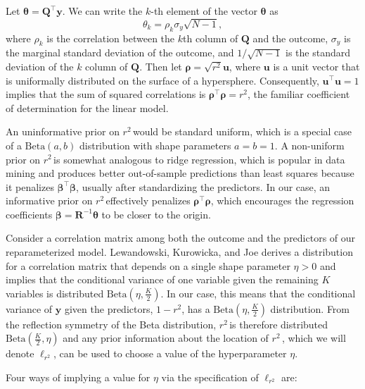 \documentclass[11pt]{article}
\newcommand{\Rsq}{$r^2\,$}
\newcommand{\boldrho}{\boldsymbol{\rho}}
\newcommand{\boldbeta}{\boldsymbol{\beta}}
\newcommand{\boldtheta}{\boldsymbol{\theta}}
\newcommand{\y}{\mathbf{y}}
\newcommand{\Q}{\mathbf{Q}}
\newcommand{\R}{\mathbf{R}}
\renewcommand{\u}{\mathbf{u}}
\newcommand{\locRsq}{\ell_{r^2}}
\newcommand{\halfK}{\frac{K}{2}}
\newcommand{\Betadist}[2]{\mathrm{Beta}\left(#1,#2\right)}
\begin{document}
Let $\boldtheta = \Q^\top \y$. We can write the $k$-th element of the vector
$\boldtheta$ as
$$\theta_k = \rho_k \sigma_y \sqrt{N - 1},$$
where $\rho_k$ is the correlation between the $k$th column of $\Q$ and the
outcome, $\sigma_y$ is the marginal standard deviation of the outcome, and
$1/\sqrt{N-1}$ is the standard deviation of the $k$ column of $\Q$. Then let
$\boldrho = \sqrt{r^2}\u$, where $\u$ is a unit vector that is
uniformally distributed on the surface of a hypersphere. Consequently,
$\u^\top \u = 1$ implies that the sum of squared correlations is
$\boldrho^\top \boldrho = r^2$, the familiar coefficient of determination for
the linear model.

An uninformative prior on \Rsq would be standard uniform, which is a special
case of a $\Betadist{a}{b}$ distribution with shape parameters $a = b = 1$.
A non-uniform prior on \Rsq is somewhat analogous to ridge
regression, which is popular in data mining and produces better out-of-sample
predictions than least squares because it penalizes $\boldbeta^\top \boldbeta$,
usually after standardizing the predictors. In our case, an informative prior on
\Rsq effectively penalizes $\boldrho^\top \boldrho$, which encourages the
regression coefficients $\boldbeta = \R^{-1} \boldtheta$ to be closer to the
origin.

Consider a correlation matrix among both the outcome and the predictors of
our reparameterized model. Lewandowski, Kurowicka, and Joe \citeyear{lkj} derives a
distribution for a correlation matrix that depends on a single shape parameter
$\eta > 0$ and implies that the conditional variance of one variable given the
remaining $K$ variables is distributed $\Betadist{\eta}{\halfK}$. In our case,
this means that the conditional variance of $\y$ given the predictors,
$1 - r^2$, has a $\Betadist{\eta}{\halfK}$ distribution. From the
reflection symmetry of the Beta distribution, \Rsq is therefore distributed
$\Betadist{\halfK}{\eta}$ and any prior information about the location of \Rsq,
which we will denote $\locRsq$, can be used to choose a value of the
hyperparameter $\eta$.

Four ways of implying a value for $\eta$ via the specification of $\locRsq$ are:
\end{document}
